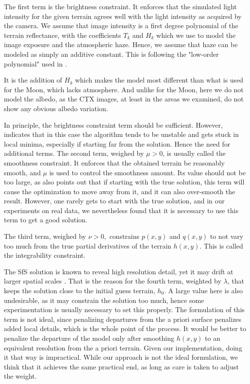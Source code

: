 \documentclass[draft,linenumbers]{agujournal}
\begin{document}
The first term is the brightness constraint. It enforces that the
simulated light intensity for the given terrain agrees well with
the light intensity as acquired by the camera. We assume that
image intensity is a first degree polynomial of the terrain reflectance,
with the coefficients $T_k$ and $H_k$ which we use to model the image exposure and
the atmospheric haze. Hence, we assume that haze can be modeled as simply an additive constant. 
This is following the "low-order polynomial" used in \citep{wohlfarth2018high}. 

It is the addition of $H_k$ which makes the model most different than what is used for the Moon,
which lacks atmosphere. And unlike for the Moon, here we do not model the albedo, 
as the CTX images, at least in the areas we examined, do not show any obvious albedo variation. 

In principle, the brightness constraint term should be sufficient. However,
\citet{horn1990height} indicates that in this case the algorithm
tends to be unstable and gets stuck in local minima, especially if
starting far from the solution. Hence the need for additional terms. 
The second term, weighed by $\mu > 0$, is usually called the smoothness constraint. It
enforces that the obtained terrain be reasonably smooth, and 
$\mu$ is used to control the smoothness amount. Its value should not be too large, as \citet{horn1990height}
also points out that if starting with the true solution, this term
will cause the optimization to move away from it, and it can also
over-smooth the result. However, one rarely gets to start with the
true solution, and in our experiments on real data, we nevertheless
found that it is necessary to use this term to get a good solution.

The third term, weighed by $\nu > 0,$ constrains $p(x, y)$ and $q(x,y)$ to not vary too much from
the true partial derivatives of the terrain $h(x, y).$ 
This is called the integrability constraint.

The SfS solution is known to reveal high resolution detail, yet it
may drift at larger spatial scales \citep{grumpe2014construction}.
That is the reason for the fourth term, weighted by $\lambda$, that
keeps the solution close to the initial guess terrain, $h_0$. A
large value here is also undesirable, as it may constrain the
solution too much, hence some experimentation is usually necessary
to set this properly. The formulation of this term is not ideal, 
since penalizing departures from the a priori surface penalizes added local
details, which is the whole point of the process.  It would be better to penalize
the departure of the model only after smoothing $h(x, y)$ to an equivalent resolution from
the a priori terrain.  Given our implementation, doing it that way is impractical.  
While our approach is not the ideal formulation, we think that it achieves the same 
practical end, as long as care is taken to adjust the weight.
\end{document}

